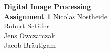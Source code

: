 \documentclass[12pt,oneside,a4paper]{scrreprt}
\title{}
\author{Patrick Flakus,Vorlage:Lutz Schülein}
\begin{document}
%
\begin{center}
\Large\textbf{Digital Image Processing
\\ Assignment 1}
\linebreak[4]
\linebreak[4]
Nicolas Nostheide \\
Robert Schäfer \\
Jens Owczarczak \\
Jacob Bräutigam
\linebreak[4]
\end{center}
%

\end{document}
